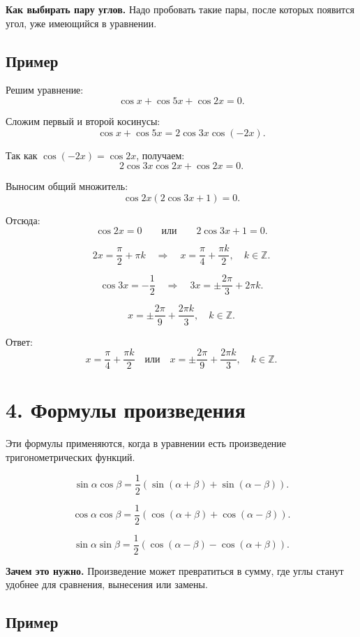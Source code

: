 \documentclass[a4paper,12pt]{article}
\newcommand{\sectionline}{\vspace{2mm}{\color{linegray}\hrule height 0.5pt}\vspace{2mm}}
\newcommand{\important}[1]{\textcolor{darkaccent}{\textbf{#1}}}
\newcommand{\Z}{\mathbb{Z}}
\begin{document}
\important{Как выбирать пару углов.} Надо пробовать такие пары, после которых появится угол, уже имеющийся в уравнении.

\subsection*{\textcolor{darkaccent}{Пример}}

Решим уравнение:
\[
\cos x+\cos 5x+\cos 2x=0.
\]

Сложим первый и второй косинусы:
\[
\cos x+\cos 5x
=
2\cos 3x\cos(-2x).
\]

Так как $\cos(-2x)=\cos 2x$, получаем:
\[
2\cos 3x\cos 2x+\cos 2x=0.
\]

Выносим общий множитель:
\[
\cos 2x(2\cos 3x+1)=0.
\]

Отсюда:
\[
\cos 2x=0
\qquad\text{или}\qquad
2\cos 3x+1=0.
\]

\[
2x=\frac{\pi}{2}+\pi k
\quad\Longrightarrow\quad
x=\frac{\pi}{4}+\frac{\pi k}{2},
\quad k\in\Z.
\]

\[
\cos 3x=-\frac12
\quad\Longrightarrow\quad
3x=\pm\frac{2\pi}{3}+2\pi k.
\]

\[
x=\pm\frac{2\pi}{9}+\frac{2\pi k}{3},
\quad k\in\Z.
\]

Ответ:
\[
\boxed{
x=\frac{\pi}{4}+\frac{\pi k}{2}
\quad\text{или}\quad
x=\pm\frac{2\pi}{9}+\frac{2\pi k}{3},
\quad k\in\Z
}.
\]

\sectionline

\section*{\textcolor{darkaccent}{4. Формулы произведения}}

Эти формулы применяются, когда в уравнении есть произведение тригонометрических функций.

\[
\sin \alpha\cos \beta
=
\frac12\left(\sin(\alpha+\beta)+\sin(\alpha-\beta)\right).
\]

\[
\cos \alpha\cos \beta
=
\frac12\left(\cos(\alpha+\beta)+\cos(\alpha-\beta)\right).
\]

\[
\sin \alpha\sin \beta
=
\frac12\left(\cos(\alpha-\beta)-\cos(\alpha+\beta)\right).
\]

\important{Зачем это нужно.} Произведение может превратиться в сумму, где углы станут удобнее для сравнения, вынесения или замены.

\subsection*{\textcolor{darkaccent}{Пример}}
\end{document}
